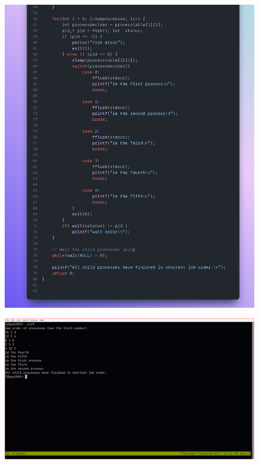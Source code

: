 \documentclass{article}
\begin{document}
   \begin{figure}[htbp]
       \centerline{ \includegraphics[width=1.5\linewidth]{fig5_a.png} }
   \end{figure}
   \begin{figure}[htbp]
       \centerline{ \includegraphics[width=1.5\linewidth]{fig6.png} }
   \end{figure}
\end{document}
